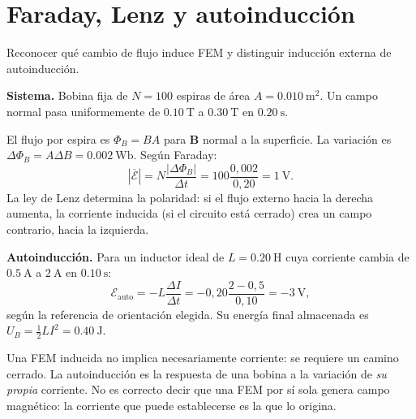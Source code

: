 \documentclass[11pt,a4paper]{article}
\newcommand{\ej}[2]{\clearpage\section{#2}}
\newcommand{\vect}[1]{\boldsymbol{#1}}
\begin{document}
\ej{11}{Faraday, Lenz y autoinducción}
\begin{objetivo}Reconocer qué cambio de flujo induce FEM y distinguir inducción externa de autoinducción.\end{objetivo}
\textbf{Sistema.} Bobina fija de $N=100$ espiras de área $A=\SI{0.010}{\metre\squared}$. Un campo normal pasa uniformemente de $\SI{0.10}{\tesla}$ a $\SI{0.30}{\tesla}$ en $\SI{0.20}{\second}$.
\begin{center}\end{center}
\begin{metodo}
El flujo por espira es $\Phi_B=BA$ para $\vect B$ normal a la superficie. La variación es $\Delta\Phi_B=A\Delta B=\SI{0.002}{\weber}$. Según Faraday:
\[|\overline{\mathcal E}|=N\frac{|\Delta\Phi_B|}{\Delta t}=100\frac{0{,}002}{0{,}20}=\boxed{\SI{1}{\volt}}.\]
La ley de Lenz determina la polaridad: si el flujo externo hacia la derecha aumenta, la corriente inducida (si el circuito está cerrado) crea un campo contrario, hacia la izquierda.
\end{metodo}
\textbf{Autoinducción.} Para un inductor ideal de $L=\SI{0.20}{\henry}$ cuya corriente cambia de $\SI{0.5}{\ampere}$ a $\SI{2}{\ampere}$ en $\SI{0.10}{\second}$:
\[\mathcal E_{\mathrm{auto}}=-L\frac{\Delta I}{\Delta t}=-0{,}20\frac{2-0{,}5}{0{,}10}=\boxed{-\SI{3}{\volt}},\]
según la referencia de orientación elegida. Su energía final almacenada es $U_B=\frac12 LI^2=\SI{0.40}{\joule}$.
\begin{resultado}Una FEM inducida no implica necesariamente corriente: se requiere un camino cerrado. La autoinducción es la respuesta de una bobina a la variación de \emph{su propia} corriente. No es correcto decir que una FEM por sí sola genera campo magnético: la corriente que puede establecerse es la que lo origina.\end{resultado}
\end{document}

